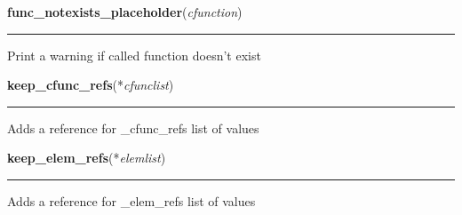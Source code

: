     \label{xformslib:library:func_notexists_placeholder}

    \vspace{0.5ex}

\hspace{.8\funcindent}\begin{boxedminipage}{\funcwidth}

    \raggedright \textbf{func\_notexists\_placeholder}(\textit{cfunction})

    \vspace{-1.5ex}

    \rule{\textwidth}{0.5\fboxrule}
\setlength{\parskip}{2ex}
    Print a warning if called function doesn't exist

\setlength{\parskip}{1ex}
    \end{boxedminipage}

    \label{xformslib:library:keep_cfunc_refs}

    \vspace{0.5ex}

\hspace{.8\funcindent}\begin{boxedminipage}{\funcwidth}

    \raggedright \textbf{keep\_cfunc\_refs}(*\textit{cfunclist})

    \vspace{-1.5ex}

    \rule{\textwidth}{0.5\fboxrule}
\setlength{\parskip}{2ex}
    Adds a reference for \_cfunc\_refs list of values

\setlength{\parskip}{1ex}
    \end{boxedminipage}

    \label{xformslib:library:keep_elem_refs}

    \vspace{0.5ex}

\hspace{.8\funcindent}\begin{boxedminipage}{\funcwidth}

    \raggedright \textbf{keep\_elem\_refs}(*\textit{elemlist})

    \vspace{-1.5ex}

    \rule{\textwidth}{0.5\fboxrule}
\setlength{\parskip}{2ex}
    Adds a reference for \_elem\_refs list of values

\setlength{\parskip}{1ex}
    \end{boxedminipage}


